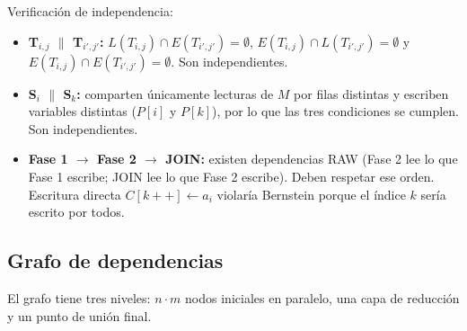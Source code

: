 Verificaci\'on de independencia:
\begin{itemize}[leftmargin=1.4cm]
  \item \textbf{T$_{i,j}$ $\parallel$ T$_{i',j'}$:} $L(T_{i,j}) \cap E(T_{i',j'}) = \emptyset$, $E(T_{i,j}) \cap L(T_{i',j'}) = \emptyset$ y $E(T_{i,j}) \cap E(T_{i',j'}) = \emptyset$. Son independientes.
  \item \textbf{S$_{i}$ $\parallel$ S$_{k}$:} comparten \'unicamente lecturas de $M$ por filas distintas y escriben variables distintas ($P[i]$ y $P[k]$), por lo que las tres condiciones se cumplen. Son independientes.
  \item \textbf{Fase 1 $\rightarrow$ Fase 2 $\rightarrow$ JOIN:} existen dependencias RAW (Fase 2 lee lo que Fase 1 escribe; JOIN lee lo que Fase 2 escribe). Deben respetar ese orden. Escritura directa $C[k++] \gets a_i$ violar\'ia Bernstein porque el \'indice $k$ ser\'ia escrito por todos.
\end{itemize}

\subsection*{Grafo de dependencias}
El grafo tiene tres niveles: $n\cdot m$ nodos iniciales en paralelo, una capa de reducci\'on y un punto de uni\'on final.

\begin{center}
\end{center}

